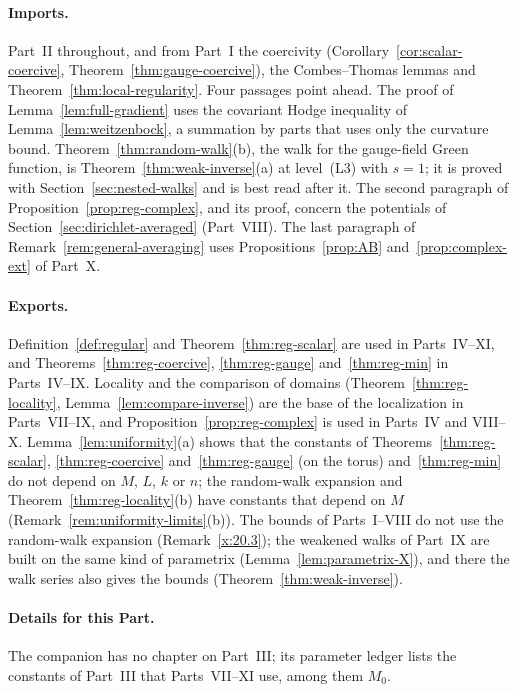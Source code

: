 \paragraph{Imports.} Part~II throughout, and from Part~I the coercivity (Corollary~\ref{cor:scalar-coercive}, Theorem~\ref{thm:gauge-coercive}), the Combes--Thomas lemmas and Theorem~\ref{thm:local-regularity}. Four passages point ahead. The proof of Lemma~\ref{lem:full-gradient} uses the covariant Hodge inequality of Lemma~\ref{lem:weitzenbock}, a summation by parts that uses only the curvature bound. Theorem~\ref{thm:random-walk}(b), the walk for the gauge-field Green function, is Theorem~\ref{thm:weak-inverse}(a) at level~(L3) with $s=1$; it is proved with Section~\ref{sec:nested-walks} and is best read after it. The second paragraph of Proposition~\ref{prop:reg-complex}, and its proof, concern the potentials of Section~\ref{sec:dirichlet-averaged} (Part~VIII). The last paragraph of Remark~\ref{rem:general-averaging} uses Propositions~\ref{prop:AB} and~\ref{prop:complex-ext} of Part~X.

\paragraph{Exports.} Definition~\ref{def:regular} and Theorem~\ref{thm:reg-scalar} are used in Parts~IV--XI, and Theorems~\ref{thm:reg-coercive}, \ref{thm:reg-gauge} and~\ref{thm:reg-min} in Parts~IV--IX. Locality and the comparison of domains (Theorem~\ref{thm:reg-locality}, Lemma~\ref{lem:compare-inverse}) are the base of the localization in Parts~VII--IX, and Proposition~\ref{prop:reg-complex} is used in Parts~IV and VIII--X. Lemma~\ref{lem:uniformity}(a) shows that the constants of Theorems~\ref{thm:reg-scalar}, \ref{thm:reg-coercive} and~\ref{thm:reg-gauge} (on the torus) and~\ref{thm:reg-min} do not depend on $M$, $L$, $k$ or $n$; the random-walk expansion and Theorem~\ref{thm:reg-locality}(b) have constants that depend on $M$ (Remark~\ref{rem:uniformity-limits}(b)). The bounds of Parts~I--VIII do not use the random-walk expansion (Remark~\ref{x:20.3}); the weakened walks of Part~IX are built on the same kind of parametrix (Lemma~\ref{lem:parametrix-X}), and there the walk series also gives the bounds (Theorem~\ref{thm:weak-inverse}).

\paragraph{Details for this Part.} The companion has no chapter on Part~III; its parameter ledger lists the constants of Part~III that Parts~VII--XI use, among them $M_0$.
